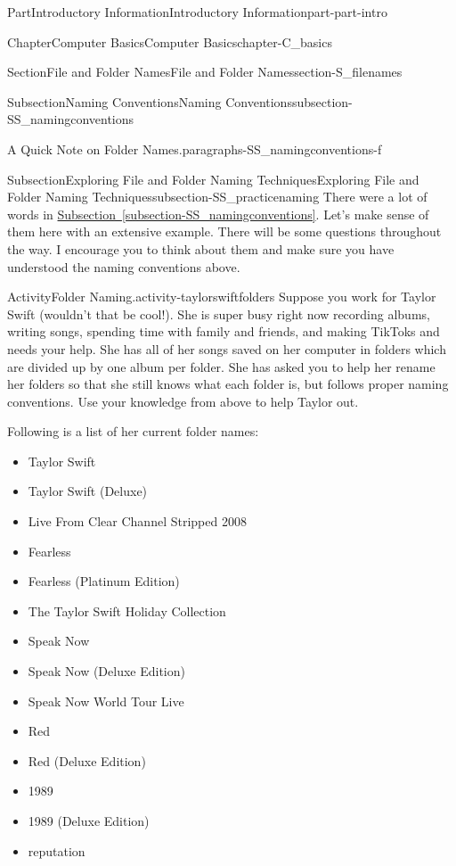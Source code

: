 \documentclass[oneside,10pt,]{book}
\newcommand{\xreffont}{\relax}
\begin{document}
\begin{partptx}{Part}{Introductory Information}{}{Introductory Information}{}{}{part-part-intro}
\begin{chapterptx}{Chapter}{Computer Basics}{}{Computer Basics}{}{}{chapter-C_basics}
\begin{sectionptx}{Section}{File and Folder Names}{}{File and Folder Names}{}{}{section-S_filenames}
\begin{subsectionptx}{Subsection}{Naming Conventions}{}{Naming Conventions}{}{}{subsection-SS_namingconventions}
\begin{paragraphs}{A Quick Note on Folder Names.}{paragraphs-SS_namingconventions-f}
\end{paragraphs}%
\end{subsectionptx}
%
%
\typeout{************************************************}
\typeout{************************************************}
%
\begin{subsectionptx}{Subsection}{Exploring File and Folder Naming Techniques}{}{Exploring File and Folder Naming Techniques}{}{}{subsection-SS_practicenaming}
There were a lot of words in \hyperref[subsection-SS_namingconventions]{Subsection~{\xreffont\ref{subsection-SS_namingconventions}}}. Let's make sense of them here with an extensive example. There will be some questions throughout the way. I encourage you to think about them and make sure you have understood the naming conventions above.%
\begin{activity}{Activity}{Folder Naming.}{activity-taylorswiftfolders}%
%
Suppose you work for Taylor Swift (wouldn't that be cool!). She is super busy right now recording albums, writing songs, spending time with family and friends, and making TikToks and needs your help. She has all of her songs saved on her computer in folders which are divided up by one album per folder. She has asked you to help her rename her folders so that she still knows what each folder is, but follows proper naming conventions. Use your knowledge from above to help Taylor out.%
\par
Following is a list of her current folder names:%
\begin{multicols}{2}
\begin{itemize}[label=\textbullet]
\item{}Taylor Swift%
\item{}Taylor Swift (Deluxe)%
\item{}Live From Clear Channel Stripped 2008%
\item{}Fearless%
\item{}Fearless (Platinum Edition)%
\item{}The Taylor Swift Holiday Collection%
\item{}Speak Now%
\item{}Speak Now (Deluxe Edition)%
\item{}Speak Now World Tour Live%
\item{}Red%
\item{}Red (Deluxe Edition)%
\item{}1989%
\item{}1989 (Deluxe Edition)%
\item{}reputation%

\end{itemize}
\end{multicols}
\end{activity}
\end{subsectionptx}
\end{sectionptx}
\end{chapterptx}
\end{partptx}
\end{document}
